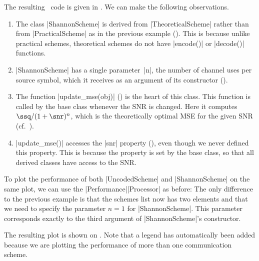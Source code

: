 The resulting \matlab\ code is given in . We can make the
following observations.
\begin{enumerate}
  \item The class |ShannonScheme| is derived from |TheoreticalScheme| rather
    than from |PracticalScheme| as in the previous example (). This
    is because unlike practical schemes, theoretical schemes do not have
    |encode()| or |decode()| functions. 
    
  \item |ShannonScheme| has a single parameter~|n|, the number of channel uses
    per source symbol, which it receives as an argument of its constructor
    ().

  \item The function |update_mse(obj)| () is the heart of this
    class. This function is called by the base class whenever the SNR is
    changed. Here it computes $\ssq / (1
    + \snr)^n$, which is the theoretically optimal MSE for the given SNR
    (cf.~).
    
  \item |update_mse()| accesses the |snr| property (), even though
    we never defined this property. This is because the property is set by the
    base class, so that all derived classes have access to the SNR.
\end{enumerate}

To plot the performance of both |UncodedScheme| and |ShannonScheme| on the same
plot, we can use the |Performance|\-|Processor| as before:
The only difference to the previous example is that the schemes list now has two
elements and that we need to specify the parameter $n=1$ for |ShannonScheme|.
This parameter corresponds exactly to the third argument of |ShannonScheme|'s
constructor.

The resulting plot is shown on . Note that a legend has
automatically been added because we are plotting the performance of more than
one communication scheme.

